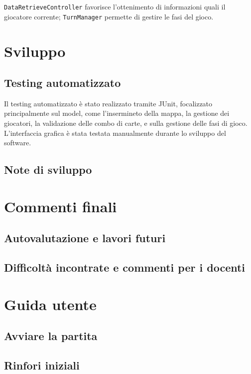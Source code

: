 \documentclass[a4paper,12pt]{report}
\begin{document}
\texttt{DataRetrieveController} favorisce l'ottenimento di informazioni quali il giocatore corrente; \texttt{TurnManager} permette di gestire le fasi del gioco.


\chapter{Sviluppo}

\section{Testing automatizzato}
Il testing automatizzato è stato realizzato tramite JUnit, focalizzato principalmente sul model, come l'insermineto della mappa, la gestione dei giocatori, la validazione delle combo di carte, e sulla gestione delle fasi di gioco.
L'interfaccia grafica è stata testata manualmente durante lo sviluppo del software.

\section{Note di sviluppo}

\chapter{Commenti finali}

\section{Autovalutazione e lavori futuri}

\section{Difficoltà incontrate e commenti per i docenti}

\appendix
\chapter{Guida utente}
\section{Avviare la partita}
\section{Rinfori iniziali}
\end{document}
